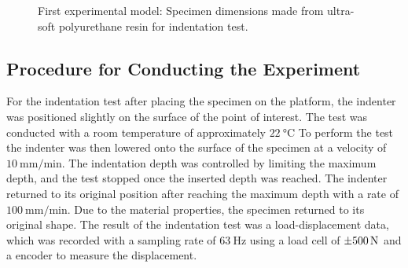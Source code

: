 \begin{figure}%
    \centering
   \qquad
   \caption[Specimen dimensions]{First experimental model: Specimen dimensions made from ultra-soft polyurethane resin for indentation test.}%
   \label{fig:specimenhole}%
\end{figure}

\subsection*{Procedure for Conducting the Experiment}
For the indentation test after placing the specimen on the platform,
the indenter was positioned slightly on the surface of the point of interest. 
The test was conducted with a room temperature of approximately $\SI{22}{\degreeCelsius}$
To perform the test the indenter was then lowered onto the surface of the specimen
at a velocity of $\SI[per-mode = symbol]{10}{\milli \m\per \minute}$.
The indentation depth was controlled by limiting the maximum depth, and the 
test stopped once the inserted depth was reached. The indenter returned to its 
original position after reaching the maximum depth with a rate of 
$\SI[per-mode = symbol]{100}{\milli \m\per \minute}$. Due to the material properties,
the specimen returned to its original shape.
The result of the indentation test was a load-displacement data,
which was recorded with a sampling rate of $\SI{63}{\hertz}$ using a load 
cell of $\SI{\pm 500}{\newton}$ and a encoder to measure the displacement.


